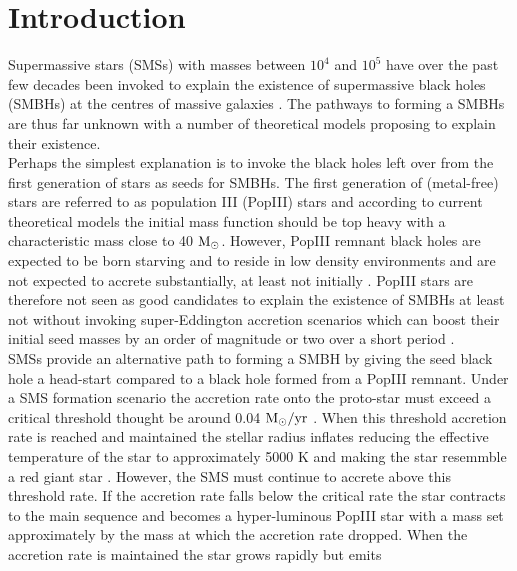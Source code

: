 \documentclass[graphics, twocolumn, usenatbib]{mn2e}
\newcommand{\msolarc} {$\rm{M_{\odot}}$}
\newcommand{\msolaryr} {$\rm{M_{\odot}/yr}~$}
\begin{document}
\section{Introduction} \label{Sec:Introduction}
Supermassive stars (SMSs) with masses between $10^4$ and $10^5$ have over the past few decades been invoked \citep{Rees_1978, Begelman_1978, Begelman_2006,
Begelman_2008, Latif_2017, Woods_2018} to explain the existence of supermassive black holes (SMBHs) at the centres of massive galaxies \citep{Fan_06, Kormendy_2013}. The pathways to forming a SMBHs are thus far unknown with a number of theoretical models proposing to explain their existence. \\
\indent Perhaps the
simplest explanation is to invoke the black holes left over from the first 
generation of stars as seeds for SMBHs. The first generation of (metal-free) 
stars are referred to as population III (PopIII) stars and according to 
current theoretical models \citep[e.g.][]{Turk_2009, Clark_2008, Hirano_2014, Stacy_2016} the initial mass function should be top heavy with a characteristic mass close to 40 \msolarc. However, PopIII remnant black holes are expected to be born starving \citep{Whalen_2004, Milosavljevic_2009} and to reside in low
density environments and are not expected to accrete substantially, at least not 
initially \citep{Alvarez_2009, Smith_2018}. PopIII stars are therefore not seen as good candidates to explain the existence of SMBHs at least not without invoking super-Eddington accretion scenarios which can boost their initial 
seed masses by an order of magnitude or two over a short period \citep{Lupi_2014, Pacucci_2015a, Sakurai_2016a,Inayoshi_2016, Pacucci_2017, Inayoshi_2018}.\\
\indent SMSs provide an alternative path to forming a SMBH by giving the seed black hole a head-start compared to a black hole formed from a PopIII remnant. Under a SMS formation scenario the accretion rate onto the proto-star must exceed a critical threshold thought be around 0.04 \msolaryr \cite{Sakurai_2016}. When
this threshold accretion rate is reached and maintained the stellar radius inflates reducing the effective temperature of the star to approximately 5000 K
and making the star resemmble a red giant star \citep{Omukai_2003, Hosokawa_2012, Hosokawa_2013, Woods_2017}. However, the SMS must continue to
accrete above this threshold rate. If the accretion rate falls below the critical
rate the star contracts to the main sequence and becomes a hyper-luminous PopIII
star with a mass set approximately by the mass at which the accretion rate dropped. When the accretion rate is maintained the star grows rapidly but emits
\end{document}
